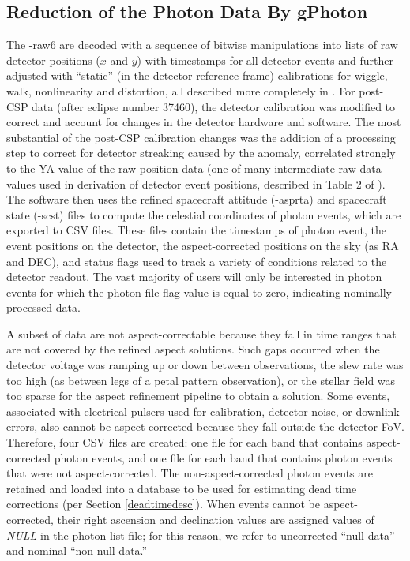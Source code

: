 \documentclass[preprint]{aastex}
\begin{document}
\subsection{Reduction of the Photon Data By gPhoton}
The -raw6 are decoded with a sequence of bitwise manipulations into lists of raw detector positions ($x$ and $y$) with timestamps for all detector events and further adjusted with ``static'' (in the detector reference frame) calibrations for wiggle, walk, nonlinearity and distortion, all described more completely in \citet{mor2007}. For post-CSP data (after eclipse number 37460), the detector calibration was modified to correct and account for changes in the detector hardware and software. The most substantial of the post-CSP calibration changes was the addition of a processing step to correct for detector streaking caused by the anomaly, correlated strongly to the YA value of the raw position data (one of many intermediate raw data values used in derivation of detector event positions, described in Table 2 of \cite{mor2007}). The software then uses the refined spacecraft attitude (-asprta) and spacecraft state (-scst) files to compute the celestial coordinates of photon events, which are exported to CSV files. These files contain the timestamps of photon event, the event positions on the detector, the aspect-corrected positions on the sky (as RA and DEC), and status flags used to track a variety of conditions related to the detector readout. The vast majority of users will only be interested in photon events for which the photon file flag value is equal to zero, indicating nominally processed data.

A subset of data are not aspect-correctable because they fall in time ranges that are not covered by the refined aspect solutions. Such gaps occurred when the detector voltage was ramping up or down between observations, the slew rate was too high (as between legs of a petal pattern observation), or the stellar field was too sparse for the aspect refinement pipeline to obtain a solution. Some events, associated with electrical pulsers used for calibration, detector noise, or downlink errors, also cannot be aspect corrected because they fall outside the detector FoV. Therefore, four CSV files are created: one file for each band that contains aspect-corrected photon events, and one file for each band that contains photon events that were not aspect-corrected. The non-aspect-corrected photon events are retained and loaded into a database to be used for estimating dead time corrections (per Section \ref{deadtimedesc}). When events cannot be aspect-corrected, their right ascension and declination values are assigned values of \emph{NULL} in the photon list file; for this reason, we refer to uncorrected ``null data'' and nominal ``non-null data.''
\end{document}
